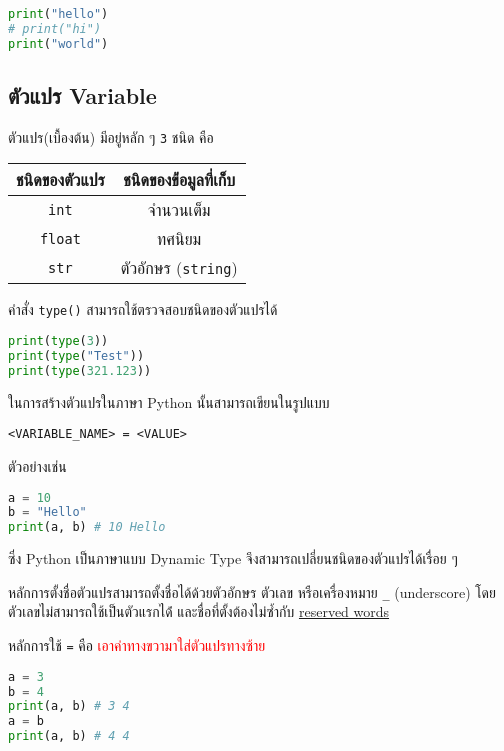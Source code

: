 \begin{lstlisting}[language=Python]
print("hello")
# print("hi")
print("world")
\end{lstlisting}

\subsection{ตัวแปร Variable}

ตัวแปร(เบื้องต้น) มีอยู่หลัก ๆ \verb|3| ชนิด คือ

\begin{center}
    \begin{tabular}{|c|c|}
        \hline
        ชนิดของตัวแปร & ชนิดของข้่อมูลที่เก็บ\\
        \hline
        \verb|int| & จำนวนเต็ม\\
        \verb|float| & ทศนิยม\\
        \verb|str| & ตัวอักษร (\verb|string|)\\
        \hline
    \end{tabular}
\end{center}

คำสั่ง \verb|type()| สามารถใช้ตรวจสอบชนิดของตัวแปรได้

\begin{lstlisting}[language=Python]
print(type(3))
print(type("Test"))
print(type(321.123))
\end{lstlisting}

ในการสร้างตัวแปรในภาษา Python นั้นสามารถเขียนในรูปแบบ

\begin{verbatim}
<VARIABLE_NAME> = <VALUE>
\end{verbatim}

ตัวอย่างเช่น

\begin{lstlisting}[language=Python]
a = 10
b = "Hello"
print(a, b) # 10 Hello
\end{lstlisting}

ซึ่ง Python เป็นภาษาแบบ Dynamic Type จึงสามารถเปลี่ยนชนิดของตัวแปรได้เรื่อย ๆ

หลักการตั้งชื่อตัวแปรสามารถตั้งชื่อได้ด้วยตัวอักษร ตัวเลข หรือเครื่องหมาย \verb|_| (underscore) โดยตัวเลขไม่สามารถใช้เป็นตัวแรกได้่ และชื่อที่ตั้งต้องไม่ซ้ำกับ \href{https://www.w3schools.com/python/python_ref_keywords.asp}{reserved words}

หลักการใช้ \verb|=| คือ \textcolor{red}{เอาค่าทางขวามาใส่ตัวแปรทางซ้าย}

\begin{lstlisting}[language=Python]
a = 3
b = 4
print(a, b) # 3 4
a = b
print(a, b) # 4 4 
\end{lstlisting}

